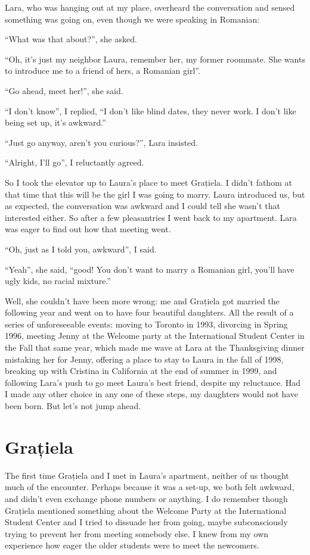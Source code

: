 \documentclass[12pt]{book}
\begin{document}
Lara, who was hanging out at my place, overheard the conversation and
sensed something was going on, even though we were speaking in Romanian:

``What was that about?'', she asked.

``Oh, it's just my neighbor Laura, remember her, my former roommate. She
wants to introduce me to a friend of hers, a Romanian girl''.

``Go ahead, meet her!'', she said.

``I don't know'', I replied, ``I don't like blind dates, they never
work. I don't like being set up, it's awkward.''

``Just go anyway, aren't you curious?'', Lara insisted.

``Alright, I'll go'', I reluctantly agreed.

So I took the elevator up to Laura's place to meet Grațiela. I didn't
fathom at that time that this will be the girl I was going to marry.
Laura introduced us, but as expected, the conversation was awkward and I
could tell she wasn't that interested either. So after a few
pleasantries I went back to my apartment. Lara was eager to find out how
that meeting went.

``Oh, just as I told you, awkward'', I said.

``Yeah'', she said, ``good! You don't want to marry a Romanian girl,
you'll have ugly kids, no racial mixture.''

Well, she couldn't have been more wrong: me and Grațiela got married the
following year and went on to have four beautiful daughters. All the
result of a series of unforeseeable events: moving to Toronto in 1993,
divorcing in Spring 1996, meeting Jenny at the Welcome party at the
International Student Center in the Fall that same year, which made me
wave at Lara at the Thanksgiving dinner mistaking her for Jenny,
offering a place to stay to Laura in the fall of 1998, breaking up with
Cristina in California at the end of summer in 1999, and following
Lara's push to go meet Laura's best friend, despite my reluctance. Had I
made any other choice in any one of these steps, my daughters would not
have been born. But let's not jump ahead.


\section{Grațiela}           

The first time Grațiela and I met in Laura's apartment, neither of us
thought much of the encounter. Perhaps because it was a set-up, we both
felt awkward, and didn't even exchange phone numbers or anything. I do
remember though Grațiela mentioned something about the Welcome Party at
the International Student Center and I tried to dissuade her from going,
maybe subconsciously trying to prevent her from meeting somebody else. I
knew from my own experience how eager the older students were to meet
the newcomers.
\end{document}
